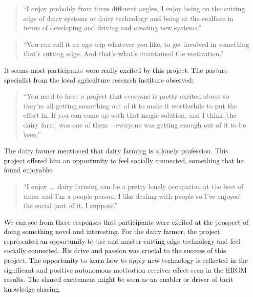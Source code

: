 \begin{quote}
\small
\enquote{I enjoy probably from three different angles, I enjoy being on the cutting edge of dairy systems or dairy technology and being at the coalface in terms of developing and driving and creating new systems.} \\
\end{quote}

\begin{quote}
\small
\enquote{You can call it an ego trip whatever you like, to get involved in something that's cutting edge. And that's what's maintained the motivation.} \\
\end{quote}

It seems most participants were really excited by this project. The pasture specialist from the local agriculture research institute observed:

\begin{quote}
\small
\enquote{You need to have a project that everyone is pretty excited about so they're all getting something out of it to make it worthwhile to put the effort in. If you can come up with that magic solution, and I think [the dairy farm] was one of them -- everyone was getting enough out of it to be keen.} \\
\end{quote}

The dairy farmer mentioned that dairy farming is a lonely profession. This project offered him an opportunity to feel socially connected, something that he found enjoyable:

\begin{quote}
\small
\enquote{I enjoy ... dairy farming can be a pretty lonely occupation at the best of times and I'm a people person, I like dealing with people so I've enjoyed the social part of it, I suppose.} \\
\end{quote}

We can see from these responses that participants were excited at the prospect of doing something novel and interesting. For the dairy farmer, the project represented an opportunity to use and master cutting edge technology and feel socially connected. His drive and passion was crucial to the success of this project. The opportunity to learn how to apply new technology is reflected in the significant and positive autonomous motivation receiver effect seen in the ERGM results. The shared excitement might be seen as an enabler or driver of tacit knowledge sharing.

